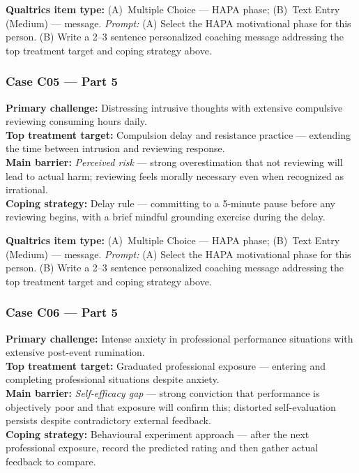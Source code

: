 \documentclass[11pt,a4paper]{article}
\newcommand{\haparesponse}[1]{\begin{tcolorbox}[colback=ResponseBG,colframe=GoldAmber,boxrule=0.6pt,arc=1.5mm,left=6pt,right=6pt,top=5pt,bottom=5pt]\small\textbf{\color{GoldAmber}Qualtrics item type:} (A)~Multiple Choice --- HAPA phase; (B)~Text Entry (Medium) --- message. \quad \textit{Prompt:} #1\end{tcolorbox}}
\begin{document}
\haparesponse{(A) Select the HAPA motivational phase for this person. (B) Write a 2--3 sentence personalized coaching message addressing the top treatment target and coping strategy above.}

\vspace{0.4em}

\subsubsection*{Case C05 --- Part 5}

\begin{contextbox}
\small
\textbf{Primary challenge:} Distressing intrusive thoughts with extensive compulsive reviewing consuming hours daily.\\
\textbf{Top treatment target:} Compulsion delay and resistance practice --- extending the time between intrusion and reviewing response.\\
\textbf{Main barrier:} \textit{Perceived risk} --- strong overestimation that not reviewing will lead to actual harm; reviewing feels morally necessary even when recognized as irrational.\\
\textbf{Coping strategy:} Delay rule --- committing to a 5-minute pause before any reviewing begins, with a brief mindful grounding exercise during the delay.
\end{contextbox}

\haparesponse{(A) Select the HAPA motivational phase for this person. (B) Write a 2--3 sentence personalized coaching message addressing the top treatment target and coping strategy above.}

\vspace{0.4em}

\subsubsection*{Case C06 --- Part 5}

\begin{contextbox}
\small
\textbf{Primary challenge:} Intense anxiety in professional performance situations with extensive post-event rumination.\\
\textbf{Top treatment target:} Graduated professional exposure --- entering and completing professional situations despite anxiety.\\
\textbf{Main barrier:} \textit{Self-efficacy gap} --- strong conviction that performance is objectively poor and that exposure will confirm this; distorted self-evaluation persists despite contradictory external feedback.\\
\textbf{Coping strategy:} Behavioural experiment approach --- after the next professional exposure, record the predicted rating and then gather actual feedback to compare.
\end{contextbox}
\end{document}
